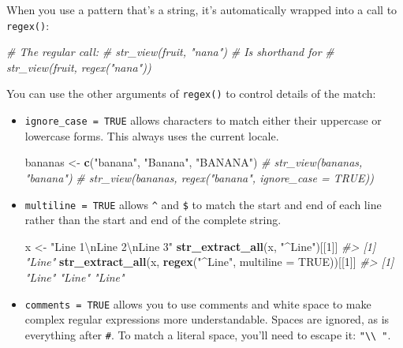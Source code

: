 \documentclass[]{book}
\newenvironment{Shaded}{\begin{snugshade}}{\end{snugshade}}
\newcommand{\KeywordTok}[1]{\textcolor[rgb]{0.13,0.29,0.53}{\textbf{{#1}}}}
\newcommand{\DataTypeTok}[1]{\textcolor[rgb]{0.13,0.29,0.53}{{#1}}}
\newcommand{\DecValTok}[1]{\textcolor[rgb]{0.00,0.00,0.81}{{#1}}}
\newcommand{\CharTok}[1]{\textcolor[rgb]{0.31,0.60,0.02}{{#1}}}
\newcommand{\StringTok}[1]{\textcolor[rgb]{0.31,0.60,0.02}{{#1}}}
\newcommand{\CommentTok}[1]{\textcolor[rgb]{0.56,0.35,0.01}{\textit{{#1}}}}
\newcommand{\OtherTok}[1]{\textcolor[rgb]{0.56,0.35,0.01}{{#1}}}
\newcommand{\NormalTok}[1]{{#1}}
\begin{document}
When you use a pattern that's a string, it's automatically wrapped into
a call to \texttt{regex()}:

\begin{Shaded}
\begin{Highlighting}[]
\CommentTok{# The regular call:}
\CommentTok{# str_view(fruit, "nana")}
\CommentTok{# Is shorthand for}
\CommentTok{# str_view(fruit, regex("nana"))}
\end{Highlighting}
\end{Shaded}

You can use the other arguments of \texttt{regex()} to control details
of the match:

\begin{itemize}
\item
  \texttt{ignore\_case\ =\ TRUE} allows characters to match either their
  uppercase or lowercase forms. This always uses the current locale.

\begin{Shaded}
\begin{Highlighting}[]
\NormalTok{bananas <-}\StringTok{ }\KeywordTok{c}\NormalTok{(}\StringTok{"banana"}\NormalTok{, }\StringTok{"Banana"}\NormalTok{, }\StringTok{"BANANA"}\NormalTok{)}
\CommentTok{# str_view(bananas, "banana")}
\CommentTok{# str_view(bananas, regex("banana", ignore_case = TRUE))}
\end{Highlighting}
\end{Shaded}
\item
  \texttt{multiline\ =\ TRUE} allows \texttt{\^{}} and \texttt{\$} to
  match the start and end of each line rather than the start and end of
  the complete string.

\begin{Shaded}
\begin{Highlighting}[]
\NormalTok{x <-}\StringTok{ "Line 1}\CharTok{\textbackslash{}n}\StringTok{Line 2}\CharTok{\textbackslash{}n}\StringTok{Line 3"}
\KeywordTok{str_extract_all}\NormalTok{(x, }\StringTok{"^Line"}\NormalTok{)[[}\DecValTok{1}\NormalTok{]]}
\CommentTok{#> [1] "Line"}
\KeywordTok{str_extract_all}\NormalTok{(x, }\KeywordTok{regex}\NormalTok{(}\StringTok{"^Line"}\NormalTok{, }\DataTypeTok{multiline =} \OtherTok{TRUE}\NormalTok{))[[}\DecValTok{1}\NormalTok{]]}
\CommentTok{#> [1] "Line" "Line" "Line"}
\end{Highlighting}
\end{Shaded}
\item
  \texttt{comments\ =\ TRUE} allows you to use comments and white space
  to make complex regular expressions more understandable. Spaces are
  ignored, as is everything after \texttt{\#}. To match a literal space,
  you'll need to escape it:
  \texttt{"\textbackslash{}\textbackslash{}\ "}.


\end{itemize}
\end{document}
